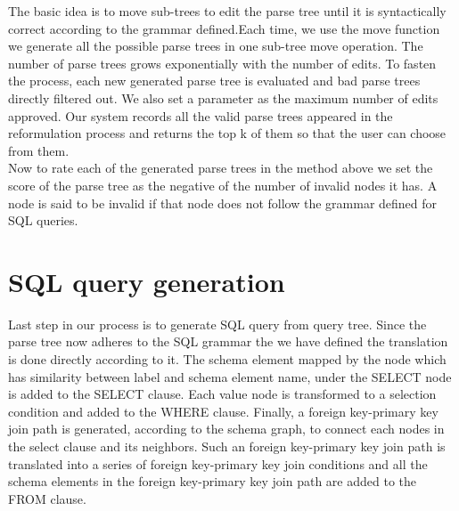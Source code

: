 The basic idea is to move sub-trees to edit the parse tree until it is syntactically correct according to the grammar defined.Each time, we use the move function we  generate all the possible parse trees in one
sub-tree move operation. The number of parse trees grows exponentially with the number of edits. To fasten the process,
 each new generated parse tree is evaluated and
 bad parse trees directly filtered out. We also set a parameter as the
maximum number of edits approved. Our system
records all the valid parse trees appeared in the reformulation process and returns the top k of them so that the user can choose from them.\\
Now to rate each of the generated parse trees in the method above we set the score of the parse tree as the negative of the number of invalid nodes it has. A node is said to be invalid if that node does not follow the grammar defined for SQL queries.



\section{SQL query generation}
Last step in our process is to generate SQL query from query tree. Since the parse tree now adheres to the SQL grammar the we have defined the translation is done directly according to it. The schema element mapped by the node which has similarity between label and schema element name, under the SELECT node is added
to the SELECT clause. Each value node is transformed to a selection condition and added to the WHERE clause. Finally, a foreign key-primary key
join path is generated, according to the schema graph, to
connect each nodes in the select clause and its neighbors. Such an foreign key-primary key join path is translated into a series of foreign key-primary key join conditions and all the schema elements in the foreign key-primary key join path are added to the FROM clause.\cite{eleven}




